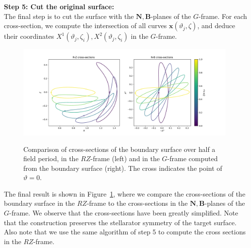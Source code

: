 \documentclass[12pt]{iopart}
\newcommand\hladdedrev[1]{#1} %
\newcommand\Nnew{{\bm N}}
\newcommand\Bnew{{\bm B}}
\newcommand\GFF{$G$-frame}
\newcommand\RZF{$RZ$-frame}
\newcommand{\thet}{\vartheta}
\newcommand\NBplanes[1]{$\Nnew,\Bnew$-planes{#1}}
\begin{document}
\hladdedrev{
\textbf{Step 5: Cut the original surface:}\\
    The final step is to cut the surface with the \NBplanes{ } of the \GFF{}. For each cross-section, we compute the intersection of all curves $\bm x(\thet_j,\zeta)$, and  deduce their coordinates $X^1(\thet_j,\zeta_i),X^2(\thet_j,\zeta_i)$ in the \GFF{}.}


\begin{figure}[htbp!]
    \centering
    \includegraphics[trim=40 10 90 20,clip,width=0.98\textwidth]{pics/quasr/quasr_cross_section_RZ_NB.pdf}\\
    \caption{Comparison of cross-sections of the boundary surface over half a field period, in the \RZF{} (left) and in the \GFF{}  computed from the boundary surface (right). The cross indicates the point of $\thet=0$.}
    \label{fig:quasr_cross_sections}
\end{figure}

\hladdedrev{The final result is shown in Figure~\ref{fig:quasr_cross_sections}, where we compare the cross-sections of the boundary surface in the \RZF{} to the cross-sections in the \NBplanes{ } of the \GFF{}. We observe that the cross-sections have been greatly simplified. Note that the construction preserves the stellarator symmetry of the target surface. Also note that we use the same algorithm of step 5 to compute the cross sections in the \RZF{}.}
\end{document}
